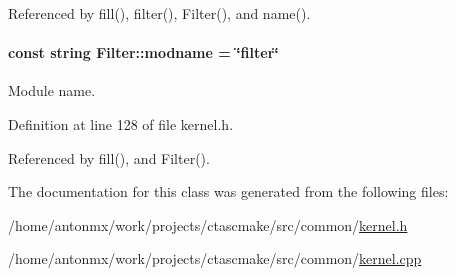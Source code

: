 Referenced by fill(), filter(), Filter(), and name().

\hypertarget{classFilter_af1862c4a04a13844bd9c9caff1e7fd21}{
\paragraph[{modname}]{\setlength{\rightskip}{0pt plus 5cm}const string {\bf Filter::modname} = \char`\"{}filter\char`\"{}}\hfill}
\label{classFilter_af1862c4a04a13844bd9c9caff1e7fd21}


Module name. 



Definition at line 128 of file kernel.h.



Referenced by fill(), and Filter().



The documentation for this class was generated from the following files:\begin{DoxyCompactItemize}
\item 
/home/antonmx/work/projects/ctascmake/src/common/\hyperlink{kernel_8h}{kernel.h}\item 
/home/antonmx/work/projects/ctascmake/src/common/\hyperlink{kernel_8cpp}{kernel.cpp}\end{DoxyCompactItemize}
